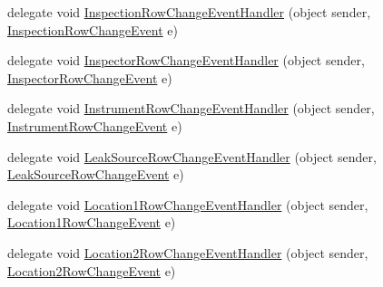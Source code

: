 \begin{DoxyCompactItemize}
\item 
delegate void \hyperlink{class_env_int_1_1_win32_1_1_field_tech_1_1_manager_1_1_data_sets_1_1_guide_ware_mobile_data_set_ae19b5244eb5bea018bbc498378447759}{Inspection\+Row\+Change\+Event\+Handler} (object sender, \hyperlink{class_env_int_1_1_win32_1_1_field_tech_1_1_manager_1_1_data_sets_1_1_guide_ware_mobile_data_set_1_1_inspection_row_change_event}{Inspection\+Row\+Change\+Event} e)
\item 
delegate void \hyperlink{class_env_int_1_1_win32_1_1_field_tech_1_1_manager_1_1_data_sets_1_1_guide_ware_mobile_data_set_aeddc5131b501c25321fe024d37442034}{Inspector\+Row\+Change\+Event\+Handler} (object sender, \hyperlink{class_env_int_1_1_win32_1_1_field_tech_1_1_manager_1_1_data_sets_1_1_guide_ware_mobile_data_set_1_1_inspector_row_change_event}{Inspector\+Row\+Change\+Event} e)
\item 
delegate void \hyperlink{class_env_int_1_1_win32_1_1_field_tech_1_1_manager_1_1_data_sets_1_1_guide_ware_mobile_data_set_ad940ee36693fa300fc3113b12a98fef3}{Instrument\+Row\+Change\+Event\+Handler} (object sender, \hyperlink{class_env_int_1_1_win32_1_1_field_tech_1_1_manager_1_1_data_sets_1_1_guide_ware_mobile_data_set_1_1_instrument_row_change_event}{Instrument\+Row\+Change\+Event} e)
\item 
delegate void \hyperlink{class_env_int_1_1_win32_1_1_field_tech_1_1_manager_1_1_data_sets_1_1_guide_ware_mobile_data_set_a9dd35aa7852f0dab912fa474e360b454}{Leak\+Source\+Row\+Change\+Event\+Handler} (object sender, \hyperlink{class_env_int_1_1_win32_1_1_field_tech_1_1_manager_1_1_data_sets_1_1_guide_ware_mobile_data_set_86c0d6f3fd40b47433420931434d32a7}{Leak\+Source\+Row\+Change\+Event} e)
\item 
delegate void \hyperlink{class_env_int_1_1_win32_1_1_field_tech_1_1_manager_1_1_data_sets_1_1_guide_ware_mobile_data_set_ae3a4db5cb436e61b5641813fae964c22}{Location1\+Row\+Change\+Event\+Handler} (object sender, \hyperlink{class_env_int_1_1_win32_1_1_field_tech_1_1_manager_1_1_data_sets_1_1_guide_ware_mobile_data_set_1_1_location1_row_change_event}{Location1\+Row\+Change\+Event} e)
\item 
delegate void \hyperlink{class_env_int_1_1_win32_1_1_field_tech_1_1_manager_1_1_data_sets_1_1_guide_ware_mobile_data_set_a2de82c6aada07f571f168a4bf62f5bed}{Location2\+Row\+Change\+Event\+Handler} (object sender, \hyperlink{class_env_int_1_1_win32_1_1_field_tech_1_1_manager_1_1_data_sets_1_1_guide_ware_mobile_data_set_1_1_location2_row_change_event}{Location2\+Row\+Change\+Event} e)

\end{DoxyCompactItemize}
